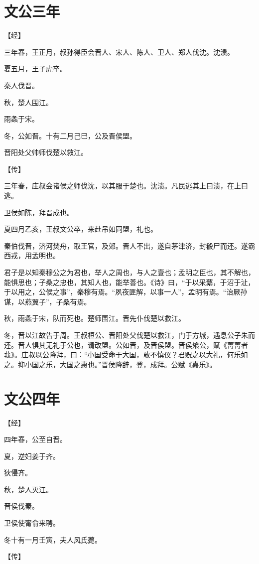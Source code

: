 \documentclass[a4paper,12pt,UTF8,twoside]{ctexbook}
\begin{document}
\section{文公三年}




【经】

三年春，王正月，叔孙得臣会晋人、宋人、陈人、卫人、郑人伐沈。沈溃。

夏五月，王子虎卒。

秦人伐晋。

秋，楚人围江。

雨螽于宋。

冬，公如晋。十有二月己巳，公及晋侯盟。

晋阳处父帅师伐楚以救江。

【传】

三年春，庄叔会诸侯之师伐沈，以其服于楚也。沈溃。凡民逃其上曰溃，在上曰逃。

卫侯如陈，拜晋成也。

夏四月乙亥，王叔文公卒，来赴吊如同盟，礼也。

秦伯伐晋，济河焚舟，取王官，及郊。晋人不出，遂自茅津济，封殽尸而还。遂霸西戎，用孟明也。

君子是以知秦穆公之为君也，举人之周也，与人之壹也；孟明之臣也，其不解也，能惧思也；子桑之忠也，其知人也，能举善也。《诗》曰，“于以采蘩，于沼于沚，于以用之，公侯之事”，秦穆有焉。“夙夜匪解，以事一人”，孟明有焉。“诒厥孙谋，以燕翼子”，子桑有焉。

秋，雨螽于宋，队而死也。楚师围江。晋先仆伐楚以救江。

冬，晋以江故告于周。王叔桓公、晋阳处父伐楚以救江，门于方城，遇息公子朱而还。晋人惧其无礼于公也，请改盟。公如晋，及晋侯盟。晋侯飨公，赋《菁菁者莪》。庄叔以公降拜，曰：“小国受命于大国，敢不慎仪？君贶之以大礼，何乐如之。抑小国之乐，大国之惠也。”晋侯降辞，登，成拜。公赋《嘉乐》。


\section{文公四年}


【经】

四年春，公至自晋。

夏，逆妇姜于齐。

狄侵齐。

秋，楚人灭江。

晋侯伐秦。

卫侯使甯俞来聘。

冬十有一月壬寅，夫人风氏薨。

【传】
\end{document}
